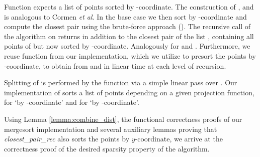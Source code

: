 \begin{isabellebody}
\begin{isamarkuptext}
\begin{quote}
 \vskip 0pt
\end{quote}

Function  expects a list of points  sorted by -coordinate. The
construction of ,  and  is analogous to Cormen \emph{et al}. In the base case we then
sort  by -coordinate and compute the closest pair using the brute-force approach
(). The recursive call of the algorithm on  returns in addition to the
closest pair of  the list , containing all points of  but now sorted by -coordinate.
Analogously for  and . Furthermore, we reuse function  from our 
implementation, which we utilize to presort the points by -coordinate, to obtain  from 
and  in linear time at each level of recursion.

Splitting of  is performed
by the function  via a simple linear pass over . Our implementation of
 sorts a list of points depending on a given projection function, 
for `by -coordinate' and  for `by -coordinate'.

Using Lemma \ref{lemma:combine_dist}, the functional correctness proofs of our mergesort implementation
and several auxiliary lemmas proving that \textit{closest\_pair\_rec} also sorts the points by $y$-coordinate,
we arrive at the correctness proof of the desired sparsity property of the algorithm.

\begin{theorem}
 \vskip 0pt
\end{theorem}


\end{isamarkuptext}
\end{isabellebody}
